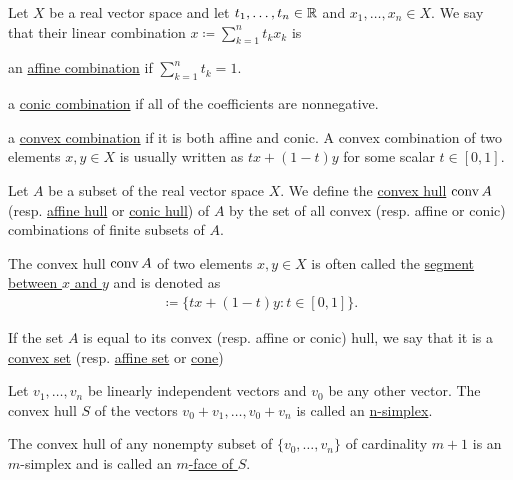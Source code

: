 \begin{definition}\label{def:real_linear_combinations}
  Let $X$ be a real vector space and let $t_1, \ldots, t_n \in \mathbb R$ and $x_1, \ldots, x_n \in X$. We say that their linear combination $x \coloneqq \sum_{k=1}^n t_k x_k$ is

  \begin{defenum}
    \item\label{def:real_linear_combinations/affine} an \uline{affine combination} if $\sum_{k=1}^n t_k = 1$.
    \item\label{def:real_linear_combinations/conic} a \uline{conic combination} if all of the coefficients are nonnegative.
    \item\label{def:real_linear_combinations/convex} a \uline{convex combination} if it is both affine and conic. A convex combination of two elements $x, y \in X$ is usually written as $tx + (1-t)y$ for some scalar $t \in [0, 1]$.
  \end{defenum}
\end{definition}

\begin{definition}\label{def:linear_combination_hulls}
  Let $A$ be a subset of the real vector space $X$. We define the \uline{convex hull} $\operatorname{conv} A$ (resp. \uline{affine hull} or \uline{conic hull}) of $A$ by the set of all convex (resp. affine or conic) combinations of finite subsets of $A$.

  The convex hull $\operatorname{conv} A$ of two elements $x, y \in X$ is often called the \uline{segment between $x$ and $y$} and is denoted as
  \begin{align*}
    [x, y] \coloneqq \{ tx + (1-t)y \colon t \in [0, 1] \}.
  \end{align*}

  If the set $A$ is equal to its convex (resp. affine or conic) hull, we say that it is a \uline{convex set} (resp. \uline{affine set} or \uline{cone})
\end{definition}

\begin{definition}\label{def:simplex}
  Let $v_1, \ldots, v_n$ be linearly independent vectors and $v_0$ be any other vector. The convex hull $S$ of the vectors $v_0 + v_1, \ldots, v_0 + v_n$ is called an \uline{n-simplex}.

  The convex hull of any nonempty subset of $\{ v_0, \ldots, v_n \}$ of cardinality $m + 1$ is an $m$-simplex and is called an \uline{$m$-face of $S$}.
\end{definition}
